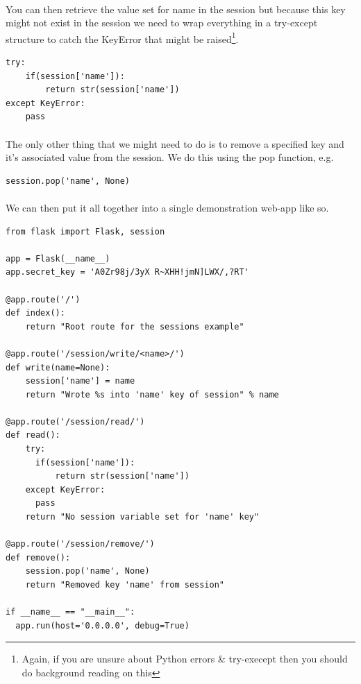 \documentclass[12pt, a4paper, oneside]{book}
\begin{document}
{\paragraph{} You can then retrieve the value set for name in the session but because this key might not exist in the session we need to wrap everything in a try-except structure to catch the KeyError that might be raised\footnote{Again, if you are unsure about Python errors \& try-execept then you should do background reading on this}.
\begin{lstlisting}
try:
    if(session['name']):
        return str(session['name'])
except KeyError:
    pass
\end{lstlisting}

\paragraph{} The only other thing that we might need to do is to remove a specified key and it's associated value from the session. We do this using the pop function, e.g.
\begin{lstlisting}
session.pop('name', None)
\end{lstlisting}

\paragraph{} We can then put it all together into a single demonstration web-app like so.

\begin{lstlisting}
from flask import Flask, session

app = Flask(__name__)
app.secret_key = 'A0Zr98j/3yX R~XHH!jmN]LWX/,?RT'

@app.route('/')
def index():
    return "Root route for the sessions example"

@app.route('/session/write/<name>/')
def write(name=None):
    session['name'] = name
    return "Wrote %s into 'name' key of session" % name

@app.route('/session/read/')
def read():
    try:
      if(session['name']):
          return str(session['name'])
    except KeyError:
      pass
    return "No session variable set for 'name' key"

@app.route('/session/remove/')
def remove():
    session.pop('name', None)
    return "Removed key 'name' from session"

if __name__ == "__main__":
  app.run(host='0.0.0.0', debug=True)
\end{lstlisting}

}
\end{document}
